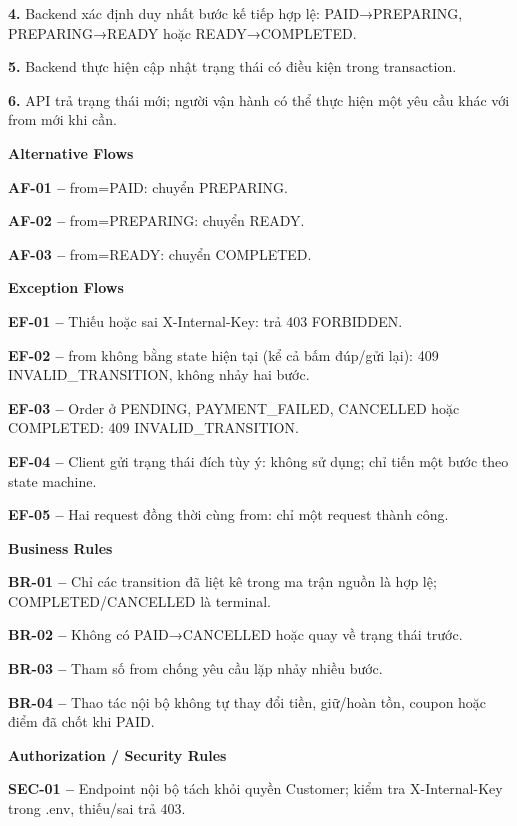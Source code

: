 \documentclass[11pt,a4paper,oneside]{report}
\begin{document}
\textbf{4.} Backend xác định duy nhất bước kế tiếp hợp lệ: PAID→PREPARING, PREPARING→READY hoặc READY→COMPLETED.

\textbf{5.} Backend thực hiện cập nhật trạng thái có điều kiện trong transaction.

\textbf{6.} API trả trạng thái mới; người vận hành có thể thực hiện một yêu cầu khác với from mới khi cần.
\par

\par\smallskip\noindent\textcolor{sgublue}{\textbf{Alternative Flows}}\par\nobreak
\textbf{AF-01 --} from=PAID: chuyển PREPARING.

\textbf{AF-02 --} from=PREPARING: chuyển READY.

\textbf{AF-03 --} from=READY: chuyển COMPLETED.
\par

\par\smallskip\noindent\textcolor{sgublue}{\textbf{Exception Flows}}\par\nobreak
\textbf{EF-01 --} Thiếu hoặc sai X-Internal-Key: trả 403 FORBIDDEN.

\textbf{EF-02 --} from không bằng state hiện tại (kể cả bấm đúp/gửi lại): 409 INVALID\_TRANSITION, không nhảy hai bước.

\textbf{EF-03 --} Order ở PENDING, PAYMENT\_FAILED, CANCELLED hoặc COMPLETED: 409 INVALID\_TRANSITION.

\textbf{EF-04 --} Client gửi trạng thái đích tùy ý: không sử dụng; chỉ tiến một bước theo state machine.

\textbf{EF-05 --} Hai request đồng thời cùng from: chỉ một request thành công.
\par

\par\smallskip\noindent\textcolor{sgublue}{\textbf{Business Rules}}\par\nobreak
\textbf{BR-01 --} Chỉ các transition đã liệt kê trong ma trận nguồn là hợp lệ; COMPLETED/CANCELLED là terminal.

\textbf{BR-02 --} Không có PAID→CANCELLED hoặc quay về trạng thái trước.

\textbf{BR-03 --} Tham số from chống yêu cầu lặp nhảy nhiều bước.

\textbf{BR-04 --} Thao tác nội bộ không tự thay đổi tiền, giữ/hoàn tồn, coupon hoặc điểm đã chốt khi PAID.
\par

\par\smallskip\noindent\textcolor{sgublue}{\textbf{Authorization / Security Rules}}\par\nobreak
\textbf{SEC-01 --} Endpoint nội bộ tách khỏi quyền Customer; kiểm tra X-Internal-Key trong .env, thiếu/sai trả 403.
\end{document}
